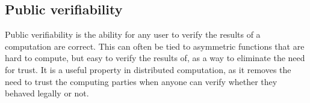 \subsection{Public verifiability}
Public verifiability is the ability for any user to verify the results of a computation are correct. This can often be tied to asymmetric functions that are hard to compute, but easy to verify the results of, as a way to eliminate the need for trust. It is a useful property in distributed computation, as it removes the need to trust the computing parties when anyone can verify whether they behaved legally or not. 